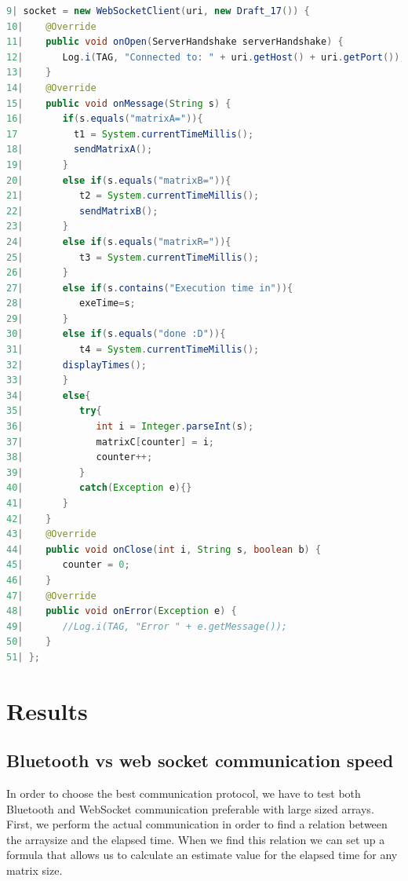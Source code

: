 \documentclass[a4paper, 11pt]{report}
\begin{document}
\begin{lstlisting}[caption={Detailed look at creating the WebSocket client},captionpos=b, label={lst:detailWebSocketClient}, language=java, float=h]
 9| socket = new WebSocketClient(uri, new Draft_17()) {
10|    @Override
11|    public void onOpen(ServerHandshake serverHandshake) {
12|       Log.i(TAG, "Connected to: " + uri.getHost() + uri.getPort());
13|    }
14|    @Override
15|    public void onMessage(String s) {
16|       if(s.equals("matrixA=")){
17			t1 = System.currentTimeMillis();
18|         sendMatrixA();
19|       }
20|       else if(s.equals("matrixB=")){
21|          t2 = System.currentTimeMillis();
22|          sendMatrixB();
23|       }
24|       else if(s.equals("matrixR=")){
25|          t3 = System.currentTimeMillis();
26|       }
27|       else if(s.contains("Execution time in")){
28|          exeTime=s;
29|       }
30|       else if(s.equals("done :D")){
31|          t4 = System.currentTimeMillis();
32|       displayTimes();
33|       }
34|       else{
35|          try{
36|             int i = Integer.parseInt(s);
37|             matrixC[counter] = i;
38|             counter++;
39|          }
40|          catch(Exception e){}
41|       }
42|    }
43|    @Override
44|    public void onClose(int i, String s, boolean b) {
45|       counter = 0;
46|    }
47|    @Override
48|    public void onError(Exception e) {
49|       //Log.i(TAG, "Error " + e.getMessage());
50|    }
51| };
\end{lstlisting}





\chapter{Results}

	\section{Bluetooth vs web socket communication speed}
In order to choose the best communication protocol, we have to test both Bluetooth and WebSocket communication preferable with large sized arrays. First, we perform the actual communication in order to find a relation between the arraysize and the elapsed time. When we find this relation we can set up a formula that allows us to calculate an estimate value for the elapsed time for any matrix size.
\end{document}
